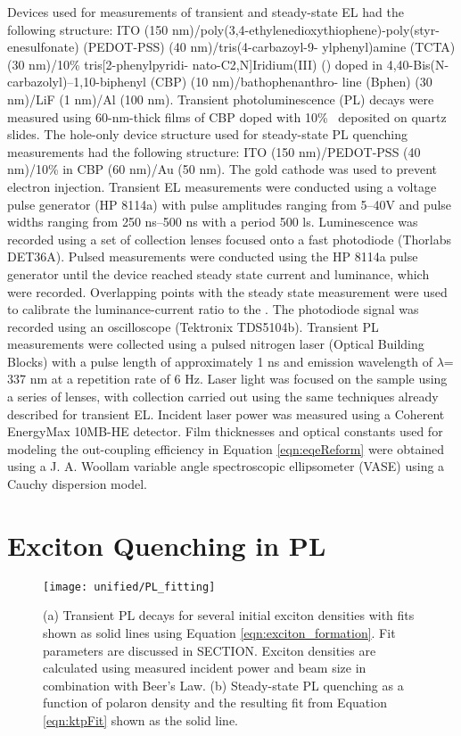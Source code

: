 \documentclass[../thesis.tex]{subfiles}
\begin{document}
Devices used for measurements of transient and steady-state EL had the following structure: ITO (150 nm)/poly(3,4-ethylenedioxythiophene)-poly(styr- enesulfonate) (PEDOT-PSS) (40 nm)/tris(4-carbazoyl-9- ylphenyl)amine (TCTA) (30 nm)/10\% tris[2-phenylpyridi- nato-C2,N]Iridium(III) (\irppy) doped in 4,40-Bis(N- carbazolyl)–1,10-biphenyl (CBP) (10 nm)/bathophenanthro- line (Bphen) (30 nm)/LiF (1 nm)/Al (100 nm). 
Transient photoluminescence (PL) decays were measured using 60-nm-thick films of CBP doped with 10\% \irppy \ deposited on quartz slides. 
The hole-only device structure used for steady-state PL quenching measurements had the following structure: ITO (150 nm)/PEDOT-PSS (40 nm)/10\% \irppy in CBP (60 nm)/Au (50 nm). The gold cathode was used to prevent electron injection. 
Transient EL measurements were conducted using a voltage pulse generator (HP 8114a) with pulse amplitudes ranging from 5–40V and pulse widths ranging from 250 ns–500 ns with a period 500 ls. 
Luminescence was recorded using a set of collection lenses focused onto a fast photodiode (Thorlabs DET36A). 
Pulsed \eqe measurements were conducted using the HP 8114a pulse generator until the device reached steady state current and luminance, which were recorded.  
Overlapping points with the steady state \eqe measurement were used to calibrate the luminance-current ratio to the \eqe.
The photodiode signal was recorded using an oscilloscope (Tektronix TDS5104b). 
Transient PL measurements were collected using a
pulsed nitrogen laser (Optical Building Blocks) with a pulse length of approximately 1 ns and emission wavelength of $\lambda$= 337 nm at a repetition rate of 6 Hz. Laser light was focused on the sample using a series of lenses, with collection carried out using the same techniques already described for transient EL. 
Incident laser power was measured using a Coherent EnergyMax 10MB-HE detector. 
Film thicknesses and optical constants used for modeling the out-coupling efficiency in Equation \ref{eqn:eqeReform} were obtained using a J. A. Woollam variable angle spectroscopic ellipsometer (VASE) using a Cauchy dispersion model.



\section{Exciton Quenching in PL}\label{sec:pl_measurements}

\begin{wrapfigure}{R}{0.5\textwidth}
\centering
\texttt{[image: unified/PL\_fitting]}
\caption{(a) Transient PL decays for several initial exciton densities with fits shown as solid lines using Equation \ref{eqn:exciton_formation}.  Fit parameters are discussed in SECTION.  Exciton densities are calculated using measured incident power and beam size in combination with Beer's Law.  (b) Steady-state PL quenching as a function of polaron density and the resulting fit from Equation \ref{eqn:ktpFit} shown as the solid line.}
\label{fig:PL_fitting}
\end{wrapfigure}
\end{document}
